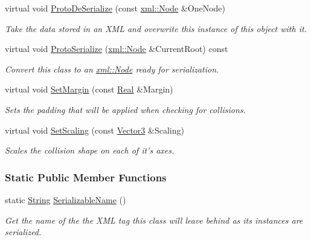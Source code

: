 \begin{DoxyCompactItemize}
virtual void \hyperlink{classMezzanine_1_1CollisionShape_aab25ef5e044b27e8e43b7e4c54ab777a}{ProtoDeSerialize} (const \hyperlink{classMezzanine_1_1xml_1_1Node}{xml::Node} \&OneNode)
\begin{DoxyCompactList}\small\item\em Take the data stored in an XML and overwrite this instance of this object with it. \item\end{DoxyCompactList}\item 
virtual void \hyperlink{classMezzanine_1_1CollisionShape_ac0995091062903d9777d0fa9bef09b90}{ProtoSerialize} (\hyperlink{classMezzanine_1_1xml_1_1Node}{xml::Node} \&CurrentRoot) const 
\begin{DoxyCompactList}\small\item\em Convert this class to an \hyperlink{classMezzanine_1_1xml_1_1Node}{xml::Node} ready for serialization. \item\end{DoxyCompactList}\item 
virtual void \hyperlink{classMezzanine_1_1CollisionShape_a3884d005f857180185a44c99e55024e3}{SetMargin} (const \hyperlink{namespaceMezzanine_a726731b1a7df72bf3583e4a97282c6f6}{Real} \&Margin)
\begin{DoxyCompactList}\small\item\em Sets the padding that will be applied when checking for collisions. \item\end{DoxyCompactList}\item 
virtual void \hyperlink{classMezzanine_1_1CollisionShape_a1017c09132113afe0f33fe9b2e7b9def}{SetScaling} (const \hyperlink{classMezzanine_1_1Vector3}{Vector3} \&Scaling)
\begin{DoxyCompactList}\small\item\em Scales the collision shape on each of it's axes. \item\end{DoxyCompactList}\end{DoxyCompactItemize}
\subsubsection*{Static Public Member Functions}
\begin{DoxyCompactItemize}
\item 
static \hyperlink{namespaceMezzanine_acf9fcc130e6ebf08e3d8491aebcf1c86}{String} \hyperlink{classMezzanine_1_1CollisionShape_ae5a97a76b687d450f17d0ac86b227f1d}{SerializableName} ()
\begin{DoxyCompactList}\small\item\em Get the name of the the XML tag this class will leave behind as its instances are serialized. \item\end{DoxyCompactList}\end{DoxyCompactItemize}
